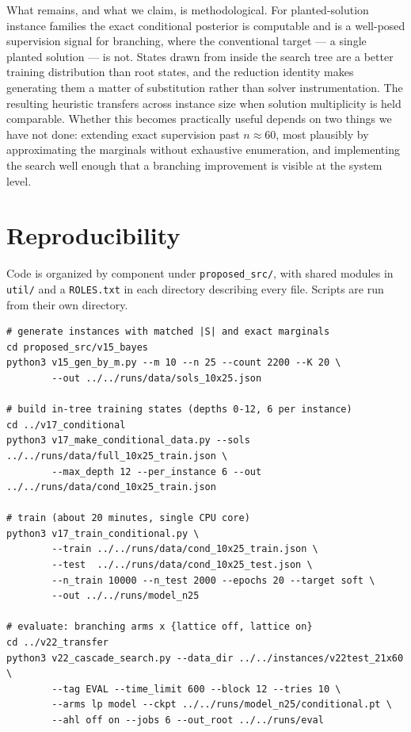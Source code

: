 \documentclass[11pt]{article}
\begin{document}
What remains, and what we claim, is methodological. For planted-solution instance families the exact conditional posterior is computable and is a well-posed supervision signal for branching, where the conventional target --- a single planted solution --- is not. States drawn from inside the search tree are a better training distribution than root states, and the reduction identity makes generating them a matter of substitution rather than solver instrumentation. The resulting heuristic transfers across instance size when solution multiplicity is held comparable. Whether this becomes practically useful depends on two things we have not done: extending exact supervision past $n\approx60$, most plausibly by approximating the marginals without exhaustive enumeration, and implementing the search well enough that a branching improvement is visible at the system level.

\section*{Reproducibility}

Code is organized by component under \texttt{proposed\_src/}, with shared modules in \texttt{util/} and a \texttt{ROLES.txt} in each directory describing every file. Scripts are run from their own directory.

\begin{verbatim}
# generate instances with matched |S| and exact marginals
cd proposed_src/v15_bayes
python3 v15_gen_by_m.py --m 10 --n 25 --count 2200 --K 20 \
        --out ../../runs/data/sols_10x25.json

# build in-tree training states (depths 0-12, 6 per instance)
cd ../v17_conditional
python3 v17_make_conditional_data.py --sols ../../runs/data/full_10x25_train.json \
        --max_depth 12 --per_instance 6 --out ../../runs/data/cond_10x25_train.json

# train (about 20 minutes, single CPU core)
python3 v17_train_conditional.py \
        --train ../../runs/data/cond_10x25_train.json \
        --test  ../../runs/data/cond_10x25_test.json \
        --n_train 10000 --n_test 2000 --epochs 20 --target soft \
        --out ../../runs/model_n25

# evaluate: branching arms x {lattice off, lattice on}
cd ../v22_transfer
python3 v22_cascade_search.py --data_dir ../../instances/v22test_21x60 \
        --tag EVAL --time_limit 600 --block 12 --tries 10 \
        --arms lp model --ckpt ../../runs/model_n25/conditional.pt \
        --ahl off on --jobs 6 --out_root ../../runs/eval
\end{verbatim}
\end{document}
